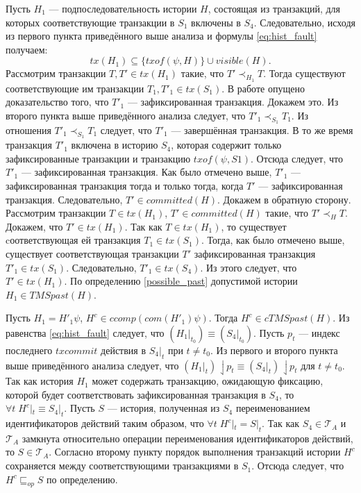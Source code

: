 \begin{myproof}
Пусть $H_1$ --- подпоследовательность истории $H$, состоящая из транзакций, для которых соответствующие транзакции в $S_1$ включены в $S_4$. Следовательно, исходя из первого пункта приведённого выше анализа и формулы \eqref{eq:hist_fault} получаем: $$ tx(H_1) \subseteq \{txof(\psi,H) \} \cup visible(H).$$
Рассмотрим транзакции $T, T' \in tx(H_1)$ такие, что $T' \prec_{H_1} T$. Тогда существуют соответствующие им транзакции $T_1,T'_1 \in tx(S_1)$. В работе \cite{tms_article} опущено доказательство того, что $T'_1$ --- зафиксированная транзакция. Докажем это. Из второго пункта выше приведённого анализа следует, что $T'_1 \prec_{S_1} T_1$. Из отношения $T'_1 \prec_{S_1} T_1$ следует, что $T'_1$ --- завершённая транзакция. В то же время транзакция $T'_1$ включена в историю $S_4$, которая содержит только зафиксированные транзакции и транзакцию $txof(\psi, S1)$. Отсюда следует, что $T'_1$ --- зафиксированная транзакция. Как было отмечено выше, $T'_1$ --- зафиксированная транзакция тогда и только тогда, когда $T'$ --- зафиксированная транзакция. Следовательно, $T' \in committed(H)$. Докажем в обратную сторону. Рассмотрим транзакции $T \in tx(H_1)$, $T' \in committed(H)$ такие, что $T' \prec_H T$. Докажем, что $T' \in tx(H_1)$. Так как $T \in tx(H_1)$, то существует cоответствующая ей транзакция $T_1 \in tx(S_1)$. Тогда, как было отмечено выше, существует соответствующая транзакции $T'$ зафиксированная транзакция $T'_1 \in tx(S_1)$. Следовательно, $T'_1 \in tx(S_4)$. Из этого следует, что $T' \in tx(H_1)$. По определению \ref{possible_past} допустимой истории $H_1 \in TMSpast(H)$.

Пусть $H_1 = H'_1\psi$, $H^c \in ccomp(com(H'_1)\psi)$. Тогда $H^c \in cTMSpast(H)$. Из равенства \eqref{eq:hist_fault} следует, что $(H_1|_{t_0}) \equiv (S_4|_{t_0})$. Пусть $p_t$ --- индекс последнего $txcommit$ действия в $S_4|_t$ при $t \neq t_0$. Из первого и второго пункта выше приведённого анализа следует, что $(H_1|_{t})\downharpoonleft {p_t} \equiv (S_4|_{t})\downharpoonleft {p_t}$ для $t \neq t_0$. Так как история $H_1$ может содержать транзакцию, ожидающую фиксацию, которой будет соответствовать зафиксированная транзакция в $S_4$, то $\forall t \; H^c|_{t} \equiv S_4|_{t}$. Пусть $S$ --- история, полученная из $S_4$ переименованием идентификаторов действий таким образом, что $\forall t \; H^c|_t = S|_t$. Так как $S_4 \in \mathcal{T}_A$ и $\mathcal{T}_A$ замкнута относительно операции переименования идентификаторов действий, то $S \in \mathcal{T}_A$. Согласно второму пункту порядок выполнения транзакций истории $H^c$ сохраняется между соответствующими транзакциями в $S_1$. Отсюда следует, что $H^c \sqsubseteq_{op} S$ по определению. 
\end{myproof}
